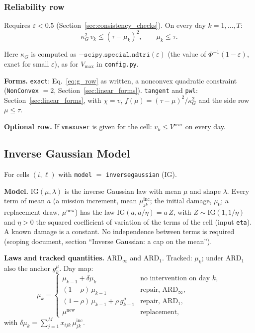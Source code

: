 \documentclass[11pt,a4paper]{article}
\theoremstyle{plain}
\theoremstyle{definition}
\newcommand{\ARDinf}{\mathrm{ARD}_{\infty}}
\newcommand{\ARDone}{\mathrm{ARD}_{1}}
\newcommand{\inc}{\mathrm{inc}}
\newcommand{\new}{\mathrm{new}}
\renewcommand{\_}{\textunderscore\allowbreak{}}
\begin{document}
\subsubsection{Reliability row}

Requires $\varepsilon < 0.5$ (Section~\ref{sec:consistency_checks}). On every day
$k = 1, \ldots, T$:
\begin{equation}
  \kappa_G^2\, v_k \leq (\tau - \mu_k)^2, \qquad \mu_k \leq \tau.
  \label{eq:g_row}
\end{equation}

Here $\kappa_G$ is computed as $-\texttt{scipy.special.ndtri}(\varepsilon)$ (the value
of $\Phi^{-1}(1 - \varepsilon)$, exact for small $\varepsilon$), as for
$V_{\max}$ in \texttt{config.py}.

\textbf{Forms.} \texttt{exact}: Eq.~\eqref{eq:g_row} as written, a nonconvex
quadratic constraint (\texttt{NonConvex} $= 2$, Section~\ref{sec:linear_forms}).
\texttt{tangent} and \texttt{pwl}: Section~\ref{sec:linear_forms}, with $\chi = v$,
$f(\mu) = (\tau - \mu)^2/\kappa_G^2$ and the side row $\mu \leq \tau$.

\textbf{Optional row.} If \texttt{v\_max\_user} is given for the cell:
$v_k \leq V^{\mathrm{user}}$ on every day.

\subsection{Inverse Gaussian Model}
\label{sec:dyn_ig}

For cells $(i,\ell)$ with \texttt{model} $=$ \texttt{inverse\_gaussian} (IG).

\textbf{Model.} $\mathrm{IG}(\mu, \lambda)$ is the inverse Gaussian law with mean
$\mu$ and shape $\lambda$. Every term of mean $a$ (a mission increment, mean
$\mu^{\inc}_{jk}$; the initial damage, $\mu_0$; a replacement draw, $\mu^{\new}$)
has the law $\mathrm{IG}(a, a/\eta) = a\,Z$, with $Z \sim \mathrm{IG}(1, 1/\eta)$
and $\eta > 0$ the squared coefficient of variation of the terms of the cell (input \texttt{eta}). A known damage is a
constant. No independence between terms is required (scoping document, section
``Inverse Gaussian: a cap on the mean'').

\textbf{Laws and tracked quantities.} $\ARDinf$ and $\ARDone$. Tracked: $\mu_k$;
under $\ARDone$ also the anchor $g^{\mu}_k$. Day map:
\begin{equation}
  \mu_k = \begin{cases}
    \mu_{k-1} + \delta\mu_k & \text{no intervention on day } k,\\
    (1-\rho)\,\mu_{k-1} & \text{repair, } \ARDinf,\\
    (1-\rho)\,\mu_{k-1} + \rho\, g^{\mu}_{k-1} & \text{repair, } \ARDone,\\
    \mu^{\new} & \text{replacement,}
  \end{cases}
  \label{eq:ig_map}
\end{equation}
with $\delta\mu_k = \sum_{j=1}^{M} x_{ijk}\,\mu^{\inc}_{jk}$.
\end{document}
